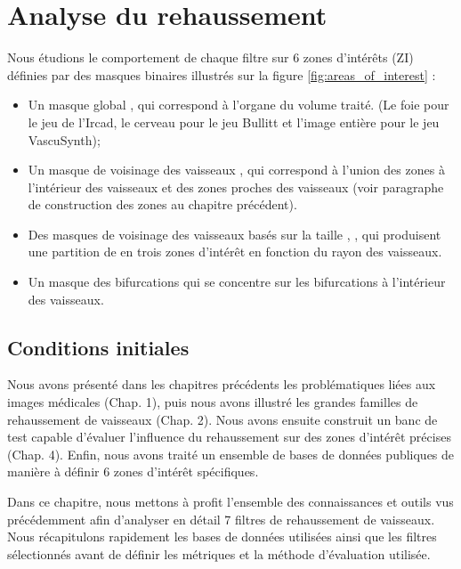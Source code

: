 \chapter{Analyse du rehaussement}


Nous étudions le comportement de chaque filtre sur 6 zones d'intérêts (ZI) définies par des masques binaires illustrés sur la figure \ref{fig:areas_of_interest} :

\begin{itemize}
\item Un masque global \maskglobal, qui correspond à l'organe du volume traité. (Le foie pour le jeu de l'Ircad, le cerveau pour le jeu Bullitt et l'image entière pour le jeu VascuSynth);
\item Un masque de voisinage des vaisseaux \maskvascular, qui correspond à l'union des zones à l'intérieur des vaisseaux et des zones proches des vaisseaux (voir paragraphe de construction des zones au chapitre précédent).
\item Des masques de voisinage des vaisseaux basés sur la taille \maskvesselLarge, \maskvesselMedium, \maskvesselSmall qui produisent une partition de \maskvascular en trois zones d'intérêt en fonction du rayon des vaisseaux.
\item Un masque des bifurcations \maskbif qui se concentre sur les bifurcations à l'intérieur des vaisseaux.
\end{itemize}

\section{Conditions initiales}

Nous avons présenté dans les chapitres précédents les problématiques liées aux images médicales (Chap. 1), puis nous avons illustré les grandes familles de rehaussement de vaisseaux (Chap. 2). Nous avons ensuite construit un banc de test capable d'évaluer l'influence du rehaussement sur des zones d'intérêt précises (Chap. 4). Enfin, nous avons traité un ensemble de bases de données publiques de manière à définir 6 zones d'intérêt spécifiques.

Dans ce chapitre, nous mettons à profit l'ensemble des connaissances et outils vus précédemment afin d'analyser en détail 7 filtres de rehaussement de vaisseaux. Nous récapitulons rapidement les bases de données utilisées ainsi que les filtres sélectionnés avant de définir les métriques et la méthode d'évaluation utilisée.

